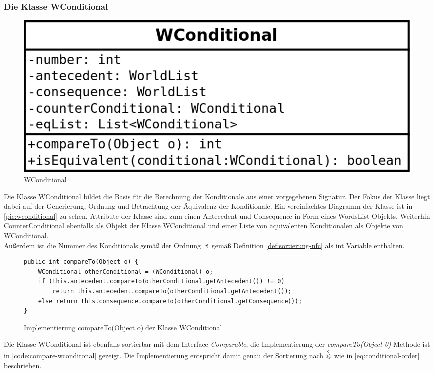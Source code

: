 \documentclass[12pt,a4paper]{article}
\newcommand\dotll{\mathrel{%
    \mathchoice{\QEQQ}{\QEQQ}{\QEQQ}{\QEQQ}%
}}
\def\QEQQ{{%
    \setbox0\hbox{$\leqslant$}%
    \rlap{\hbox to \wd0{\hss \raisebox {1pt}{$\ \cdot$\hss}}}\box0
}}
\newcommand\rdotl{\mathrel{%
    \mathchoice{\RQEQ}{\RQEQ}{\RQEQ}{\RQEQ}%
}}
\def\RQEQ{{%
    \setbox0\hbox{$\prec$}%
    \rlap{\hbox to \wd0{\hss \raisebox {0.01pt}{$\ \cdot$\hss}}}\box0
}}
\begin{document}
\subsubsection{Die Klasse WConditional} 

\begin{figure}
\includegraphics[width=0.55\linewidth]{bilder/wconditional.png}
\caption{WConditional}
\label{pic:wconditional}
\end{figure}

Die Klasse WConditional bildet die Basis für die Berechnung der Konditionale aus einer vorgegebenen Signatur. Der Fokus der Klasse liegt dabei auf der Generierung, Ordnung und Betrachtung der Äquivalenz der Konditionale. Ein vereinfachtes Diagramm der Klasse ist in \autoref{pic:wconditional} zu sehen. Attribute der Klasse sind zum einen Antecedent und Consequence in Form eines WordsList Objekts. Weiterhin CounterConditional ebenfalls als Objekt der Klasse WConditional und einer Liste von äquivalenten Konditionalen als Objekte von WConditional.\\
Außerdem ist die Nummer des Konditionals gemäß der Ordnung $\rdotl$ gemäß Definition \ref{def:sortierung-nfc} als int Variable enthalten.



\begin{figure}
\begin{lstlisting}
public int compareTo(Object o) {
    WConditional otherConditional = (WConditional) o;
    if (this.antecedent.compareTo(otherConditional.getAntecedent()) != 0)
        return this.antecedent.compareTo(otherConditional.getAntecedent());
    else return this.consequence.compareTo(otherConditional.getConsequence());
}
\end{lstlisting}
\caption{Implementierung compareTo(Object o) der Klasse WConditional}
\label{code:compare-wconditonal}
\end{figure}


Die Klasse WConditional ist ebenfalls sortierbar mit dem Interface \textit{Comparable}, die Implementierung der \textit{compareTo(Object 0)} Methode ist in \autoref{code:compare-wconditonal} gezeigt. Die Implementierung entspricht damit genau der Sortierung nach $\overset{\mathrm{c}}{\dotll}$ wie in \autoref{eq:conditional-order} beschrieben.
\end{document}
